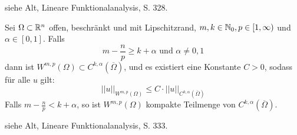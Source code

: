 	siehe Alt, \glqq Lineare Funktionalanalysis\grqq, S. 328.
	
\begin{thm} \label{thm:hoelder_einbettung} \label{thm_63}
	Sei $\Omega \subset \mathbb{R}^n$ offen, beschränkt und mit Lipschitzrand, $m, k \in \mathbb{N}_0, p \in [1,\infty)$ und $\alpha \in [0,1]$. Falls \marginnote{[63]}
	\[ m - \frac{n}{p} \geq k + \alpha \text{ und } \alpha \neq 0,1 \]
	dann ist $W^{m,p}(\Omega) \subset C^{k,\alpha}(\overline{\Omega})$, und es existiert eine Konstante $C > 0$, sodass für alle $u$ gilt:
	\[ ||u||_{W^{m,p}(\Omega)} \leq C \cdot ||u||_{C^{k,\alpha}(\overline{\Omega})} \]
	Falls $m - \frac{n}{p} < k + \alpha$, so ist $W^{m,p}(\Omega)$ kompakte Teilmenge von $C^{k,\alpha}(\overline{\Omega})$.
\end{thm}
	
	siehe Alt, \glqq Lineare Funktionalanalysis\grqq, S. 333.

\newpage